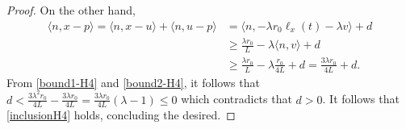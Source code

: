 \documentclass[preprint,12pt]{elsarticle}
\renewcommand{\epsilon}{\varepsilon}
\newcommand{\tto}{\rightrightarrows}
\newcommand{\ov}{\overline}
\newcommand{\inte}{{\operatorname{int \  }}}
\newcommand{\bd}{{\operatorname{bd \ }}}
\theoremstyle{plain}
\newtheorem{proposition}[theorem]{Proposition}
\theoremstyle{definition}
\theoremstyle{remark}
\begin{document}
\begin{proof}
On the other hand,
\begin{equation}\label{bound2-H4}
    \begin{aligned}
    \langle n,x-p\rangle = \langle n,x-u\rangle + \langle n, u-p\rangle&= \langle n,-\lambda r_0\ell_x(t) - \lambda v\rangle + d\\
    &\geq \frac{\lambda r_0}{L} - \lambda\langle n,v\rangle + d\\
    &\geq \frac{\lambda r_0}{L} - \lambda\frac{r_0}{4L} + d = \frac{3\lambda r_0}{4L} + d.
    \end{aligned}
\end{equation}
From \eqref{bound1-H4} and \eqref{bound2-H4}, it follows that $d< \frac{3\lambda^2 r_0}{4L}-\frac{3\lambda r_0}{4L} = \frac{3\lambda r_0}{4L}(\lambda-1)\leq 0$ which contradicts that $d>0$. It follows that \eqref{inclusionH4} holds, concluding the desired.
    \end{proof}
    
	
	
\end{document}
